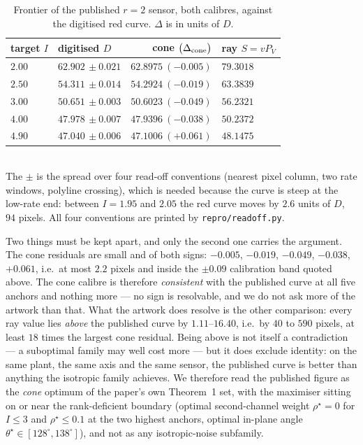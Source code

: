 \documentclass[journal]{IEEEtran}
\theoremstyle{remark}
\begin{document}
\begin{table}[h]
 \centering\caption{Frontier of the published $r=2$ sensor, both calibres,
 against the digitised red curve. $\Delta$ is in units of $D$.}
 \label{tab:red}
 \begin{tabularx}{\columnwidth}{Xlrl}
 \hline
 target $I$ & digitised $D$ & cone $\big(\Delta_{\rm cone}\big)$ &
 ray $S=vP_V$ \\
 \hline
 $2.00$ & $62.902\,\pm0.021$ & $62.8975\ (-0.005)$ & $79.3018$ \\
 $2.50$ & $54.311\,\pm0.014$ & $54.2924\ (-0.019)$ & $63.3839$ \\
 $3.00$ & $50.651\,\pm0.003$ & $50.6023\ (-0.049)$ & $56.2321$ \\
 $4.00$ & $47.978\,\pm0.007$ & $47.9396\ (-0.038)$ & $50.2372$ \\
 $4.90$ & $47.040\,\pm0.006$ & $47.1006\ (+0.061)$ & $48.1475$ \\
 \hline
 \end{tabularx}
 \\[1pt]{\scriptsize The $\pm$ is the spread over four read-off conventions
 (nearest pixel column, two rate windows, polyline crossing), which is needed
 because the curve is steep at the low-rate end: between $I=1.95$ and $2.05$
 the red curve moves by $2.6$ units of $D$, $94$ pixels. All four conventions
 are printed by \texttt{repro/readoff.py}.}
\end{table}

Two things must be kept apart, and only the second one carries the argument.
The cone residuals are small and of both signs: $-0.005$, $-0.019$, $-0.049$,
$-0.038$, $+0.061$, i.e.\ at most $2.2$ pixels and inside the $\pm0.09$
calibration band quoted above. The cone calibre is therefore
\emph{consistent} with the published curve at all five anchors and nothing more
--- no sign is resolvable, and we do not ask more of the artwork than that. What
the artwork does resolve is the other comparison: every ray value lies
\emph{above} the published curve by $1.11$--$16.40$, i.e.\ by $40$ to $590$
pixels, at least $18$ times the largest cone residual. Being above is not
itself a contradiction --- a suboptimal family may well cost more --- but it
does exclude identity: on the same plant, the same axis and the same sensor, the
published curve is better than anything the isotropic family achieves. We
therefore read the published figure as the \emph{cone} optimum of the paper's
own Theorem~1 set, with the
maximiser sitting on or near the rank-deficient boundary (optimal second-channel weight
$\rho^{\star}=0$ for $I\le3$ and $\rho^{\star}\le0.1$ at the two highest anchors,
optimal in-plane angle $\theta^{\star}\in[128^{\circ},138^{\circ}]$),
and not as any isotropic-noise subfamily. 
\end{document}

